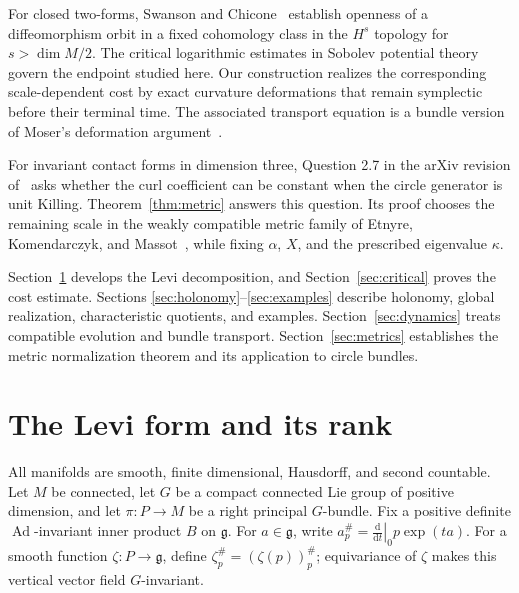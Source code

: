 \documentclass[11pt,a4paper]{article}
\numberwithin{equation}{section}
\theoremstyle{definition}
\theoremstyle{remark}
\newcommand{\g}{\mathfrak g}
\newcommand{\Ad}{\operatorname{Ad}}
\newcommand{\dd}{\mathrm d}
\begin{document}
For closed two-forms, Swanson and Chicone~\cite[Theorem 2.1]{SC} establish
openness of a diffeomorphism orbit in a fixed cohomology class in the
$H^s$ topology for $s>\dim M/2$. The critical logarithmic estimates in
Sobolev potential theory~\cite{AH} govern the endpoint studied here.
Our construction realizes the corresponding scale-dependent cost by
exact curvature deformations that remain symplectic before their terminal
time. The associated transport equation is a bundle version of Moser's
deformation argument~\cite{Moser}.

For invariant contact forms in dimension three, Question 2.7 in the
arXiv revision of~\cite{Kom} asks whether the curl coefficient can be constant
when the circle generator is unit Killing. Theorem~\ref{thm:metric}
answers this question. Its proof chooses the remaining scale in the
weakly compatible metric family of Etnyre, Komendarczyk, and
Massot~\cite[Proposition 2.1(3)]{EKM}, while fixing $\alpha$, $X$, and the
prescribed eigenvalue $\kappa$.

Section~\ref{sec:rank} develops the Levi decomposition, and
Section~\ref{sec:critical} proves the cost estimate. Sections
\ref{sec:holonomy}--\ref{sec:examples} describe holonomy, global
realization, characteristic quotients, and examples.
Section~\ref{sec:dynamics} treats compatible evolution and bundle
transport. Section~\ref{sec:metrics} establishes the metric
normalization theorem and its application to circle bundles.

\section{The Levi form and its rank}
\label{sec:rank}

All manifolds are smooth, finite dimensional, Hausdorff, and second countable.
Let $M$ be connected, let $G$ be a compact connected Lie group of positive
dimension, and let $\pi:P\to M$ be a right principal $G$-bundle. Fix a positive
definite $\Ad$-invariant inner product $B$ on $\g$. For $a\in\g$, write
$a^\#_p=\left.\frac{\dd}{\dd t}\right|_0 p\exp(ta)$.
For a smooth function $\zeta:P\to\mathfrak g$, define
$\zeta^\#_p=(\zeta(p))^\#_p$; equivariance of $\zeta$ makes this vertical
vector field $G$-invariant.
\end{document}
